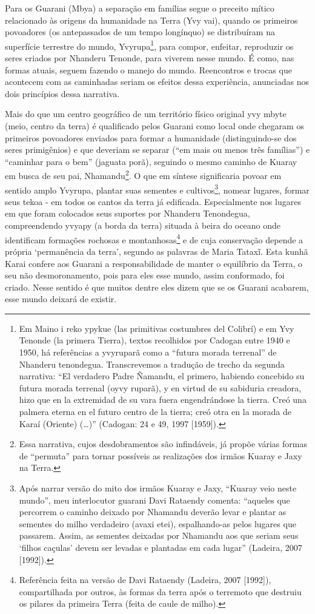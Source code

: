 Para os Guarani (Mbya) a separação em famílias segue o preceito mítico
relacionado às origens da humanidade na Terra (Yvy vai), quando os
primeiros povoadores (os antepassados de um tempo longínquo) se
distribuíram na superfície terrestre do mundo, Yvyrupa\footnote{Em
Maino i reko ypykue (las primitivas costumbres del Colibrí) e em Yvy
Tenonde (la primera Tierra), textos recolhidos por Cadogan entre 1940 e
1950, há referências a yvyruparã como a ``futura morada terrenal'' de
Nhanderu tenondegua. Transcrevemos a tradução de trecho da segunda
narrativa: ``El verdadero Padre Ñamandu, el primero, habiendo concebido
su futura morada terrenal (oyvy ruparã), y en virtud de su sabiduria
creadora, hizo que en la extremidad de su vara fuera engendrándose la
tierra. Creó una palmera eterna en el futuro centro de la tierra; creó
otra en la morada de Karaí (Oriente) (\ldots{})'' (Cadogan: 24 e 49, 1997
[1959]).}, para compor, enfeitar, reproduzir os seres criados por
Nhanderu Tenonde, para viverem nesse mundo.  É como, nas formas atuais,
seguem fazendo o manejo do mundo. Reencontros e trocas que acontecem
com as caminhadas seriam os efeitos dessa experiência, anunciadas nos
dois princípios dessa narrativa.

Mais do que um centro geográfico de um território físico original yvy
mbyte (meio, centro da terra) é qualificado pelos Guarani como local
onde chegaram os primeiros povoadores enviados para formar a humanidade
(distinguindo-se dos seres primigênios) e que deveriam se separar (``em
mais ou menos três famílias'') e ``caminhar para o bem'' (jaguata porã),
seguindo o mesmo caminho de Kuaray em busca de seu pai,
Nhamandu\footnote{Essa narrativa, cujos desdobramentos são infindáveis,
já propõe várias formas de ``permuta'' para tornar possíveis as
realizações dos irmãos Kuaray e Jaxy na Terra.}.  O que em síntese
significaria povoar em sentido amplo Yvyrupa, plantar suas sementes e
cultivos\footnote{Após narrar versão do mito dos irmãos Kuaray e Jaxy,
``Kuaray veio neste mundo'', meu interlocutor guarani Davi Rataendy
comenta: ``aqueles que percorrem o caminho deixado por Nhamandu deverão
levar e plantar as sementes do milho verdadeiro (avaxi etei),
espalhando-as pelos lugares que passarem. Assim, as sementes deixadas
por Nhamandu aos que seriam seus ‘filhos caçulas’ devem ser levadas e
plantadas em cada lugar'' (Ladeira, 2007 [1992]).}, nomear lugares,
formar seus tekoa - em todos os cantos da terra já edificada.
Especialmente nos lugares em que foram colocados seus suportes por
Nhanderu Tenondegua, compreendendo yvyapy (a borda da terra) situada à
beira do oceano onde identificam formações rochosas e
montanhosas\footnote{Referência feita na versão de Davi Rataendy
(Ladeira, 2007 [1992]), compartilhada por outros, às formas da terra
após o terremoto que destruiu os pilares da primeira Terra (feita de
caule de milho). } e de cuja conservação depende a própria ‘permanência
da terra’, segundo as palavras de Maria Tataxĩ.
Esta kunhã Karai confere aos Guarani a responsabilidade de manter o
equilíbrio da Terra, o seu não desmoronamento, pois para eles esse
mundo, assim conformado, foi criado. Nesse sentido é que muitos dentre
eles dizem que se os Guarani acabarem, esse mundo deixará de existir. 

